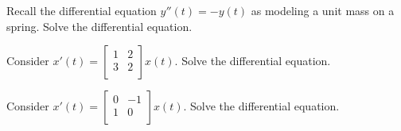 \newpage


\begin{enumerate}

\Problem Recall the differential equation $y''(t) = -y(t)$ as modeling a unit mass on a spring. Solve the differential equation.

\newpage

\Problem Consider $x'(t) = \begin{bmatrix} 1 & 2\\ 3 & 2\\ \end{bmatrix} x(t)$. Solve the differential equation.

\vfill

\Problem Consider $x'(t) = \begin{bmatrix} 0 & -1\\ 1 & 0\\ \end{bmatrix} x(t)$. Solve the differential equation.

\vfill


\newpage


\end{enumerate}

